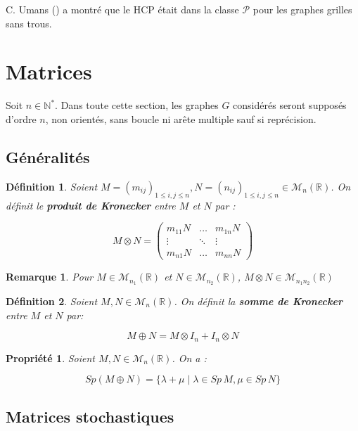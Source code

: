 \documentclass[french,a4paper]{article}
\newtheorem{definition}{Définition}[section]
\newtheorem{property}{Propriété}[section]
\newtheorem{remark}{Remarque}[section]
\begin{document}
C. Umans (\cite{Umans1996AnAF}) a montré que le HCP était dans la classe $\mathcal{P}$ pour les graphes grilles sans trous.

\section{Matrices}

Soit $n \in \mathbb{N}^*$. Dans toute cette section, les graphes $G$ considérés seront supposés d'ordre $n$, non orientés, sans boucle ni arête multiple sauf si reprécision.


\subsection{Généralités}


\begin{definition}
Soient $M=(m_{ij})_{1 \le i,j \le n},N=(n_{ij})_{1 \le i,j \le n} \in \mathcal{M}_{n}(\mathbb{R})$. On définit le \textbf{produit de Kronecker} entre $M$ et $N$ par :

\[
M \otimes N =
\begin{pmatrix}
m_{11}N & \dots & m_{1n}N \\
\vdots & \ddots & \vdots \\
m_{n1}N & \dots & m_{nn}N
\end{pmatrix}
\]
\end{definition}

\begin{remark}
Pour $M \in \mathcal{M}_{n_1}(\mathbb{R})$ et $N \in \mathcal{M}_{n_2}(\mathbb{R})$, $M \otimes N \in \mathcal{M}_{n_{1}n_{2}}(\mathbb{R})$
\end{remark}

\begin{definition}
Soient $M,N \in \mathcal{M}_{n}(\mathbb{R})$. On définit la \textbf{somme de Kronecker} entre $M$ et $N$ par:

\[
M \oplus N = M \otimes I_{n} + I_{n} \otimes N
\]
\end{definition}

\begin{property}
Soient $M,N \in \mathcal{M}_{n}(\mathbb{R})$. On a :

\[
Sp(M \oplus N)=\{\lambda+\mu \mid \lambda \in Sp \, M \text{,} \, \mu \in Sp \, N\}
\]
\end{property}


\subsection{Matrices stochastiques}
\end{document}
